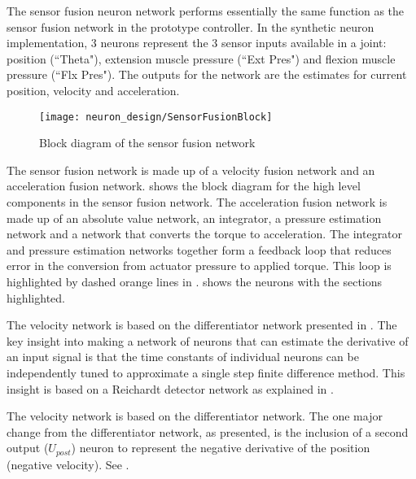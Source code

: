 
The sensor fusion neuron network performs essentially the same function as the
sensor fusion network in the prototype controller. In the synthetic neuron implementation, 3 neurons
represent the 3 sensor inputs available in a joint: position (``Theta"),
extension muscle pressure (``Ext Pres") and flexion muscle pressure
(``Flx Pres"). The outputs for the network are the estimates for current 
position, velocity and acceleration.

\begin{figure}
\centering
\texttt{[image: neuron\_design/SensorFusionBlock]}
\caption{Block diagram of the sensor fusion network}
\label{fig:SensorFusionBlock}
\end{figure}

The sensor fusion network is made up of a velocity fusion network and an acceleration fusion network.
 shows the block diagram for the high level components in the sensor fusion network.
The acceleration fusion network is made up of an absolute value network, an integrator, a pressure estimation network and a network that converts the torque to acceleration. The integrator and pressure estimation networks together form a feedback loop that reduces error in the conversion from actuator pressure to applied torque. This loop is highlighted by dashed orange lines in .
 shows the neurons with the sections highlighted.



The velocity network is based on the differentiator network presented in 
\cite{NickFunctionalSubnetwork}. The key insight into making a network
of neurons that can estimate the derivative of an input signal is that
the time constants of individual neurons can be independently tuned to 
approximate a single step finite difference method. This insight is based
on a Reichardt detector network as explained in
\cite{NickFunctionalSubnetwork}.


The velocity network is based on the differentiator network. 
The one major change from the differentiator network,
as presented, is the inclusion of a second output ($U_{post}$) neuron to 
represent the negative derivative of the position (negative velocity). See .

